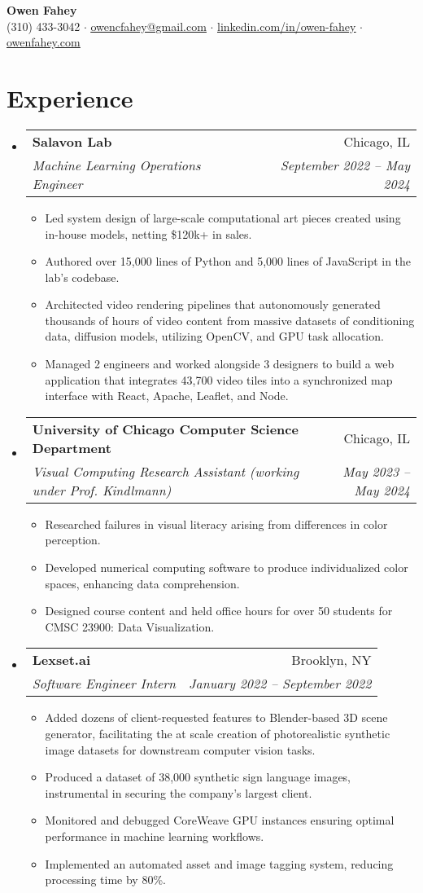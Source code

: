 \documentclass[letterpaper,11pt]{article}
\makeatletter
\newcommand{\resumeItem}[1]{
  \item\small{
    {#1 \vspace{-2pt}}
  }
}
\newcommand{\resumeSubheading}[4]{
  \vspace{-2pt}\item
    \begin{tabular*}{0.97\textwidth}[t]{l@{\extracolsep{\fill}}r}
      \textbf{#1} & #2 \\
      \textit{\small#3} & \textit{\small #4} \\
    \end{tabular*}\vspace{-7pt}
}
\newcommand{\resumeSubHeadingListStart}{\begin{itemize}[leftmargin=0.125in, label={}]}
\newcommand{\resumeSubHeadingListEnd}{\end{itemize}}
\newcommand{\resumeItemListStart}{\begin{itemize}[leftmargin=0.185in]
}
\newcommand{\resumeItemListEnd}{\end{itemize}\vspace{-5pt}}
\makeatother
\begin{document}
\begin{center}
  \textbf{\Huge 
Owen Fahey} \\
  \small (310) 433-3042 $\cdot$
  \href{mailto:owenfahey@uchicago.edu}{\underline{owencfahey@gmail.com}} $\cdot$
  \href{https://www.linkedin.com/in/owen-fahey}{\underline{linkedin.com/in/owen-fahey}} $\cdot$
  \href{https://owenfahey.com}{\underline{owenfahey.com}}
\end{center}

  
\section{Experience}
  \resumeSubHeadingListStart
    \resumeSubheading
      {Salavon Lab}
      {Chicago, IL}
      {Machine Learning Operations Engineer}
      {September 2022 -- May 2024}
      \resumeItemListStart
        \resumeItem{Led system design of large-scale computational art pieces created using in-house models, netting \$120k+ in sales.}
        \resumeItem{Authored over 15,000 lines of Python and 5,000 lines of JavaScript in the lab's codebase.}
        \resumeItem{Architected video rendering pipelines that autonomously generated thousands of hours of video content from massive datasets of conditioning data, diffusion models, utilizing OpenCV, and GPU task allocation.}
        \resumeItem{Managed 2 engineers and worked alongside 3 designers to build a web application that integrates 43,700 video tiles into a synchronized map interface with React, Apache, Leaflet, and Node.}
        
      \resumeItemListEnd
    \resumeSubheading
      {University of Chicago Computer Science Department}
      {Chicago, IL}
      {Visual Computing Research Assistant (working under Prof. Kindlmann)}
      {May 2023 -- May 2024}
      \resumeItemListStart
        \resumeItem{Researched failures in visual literacy arising from differences in color perception.}
        \resumeItem{Developed numerical computing software to produce individualized color spaces, enhancing data comprehension.}
        \resumeItem{Designed course content and held office hours for over 50 students for CMSC 23900: Data Visualization.}
      \resumeItemListEnd
    \resumeSubheading
      {Lexset.ai}
      {Brooklyn, NY}
      {Software Engineer Intern}
      {January 2022 -- September 2022}
      \resumeItemListStart
        \resumeItem{Added dozens of client-requested features to Blender-based 3D scene generator, facilitating the at scale creation of \nolinebreak photorealistic synthetic image datasets for downstream computer vision tasks.} \nolinebreak
        \resumeItem{Produced a dataset of 38,000 synthetic sign language images, instrumental in securing the company's largest client.}
        \resumeItem{Monitored and debugged CoreWeave GPU instances ensuring optimal performance in machine learning workflows. }
        \resumeItem{Implemented an automated asset and image tagging system, reducing processing time by 80\%.}
      \resumeItemListEnd
  \resumeSubHeadingListEnd
\end{document}
